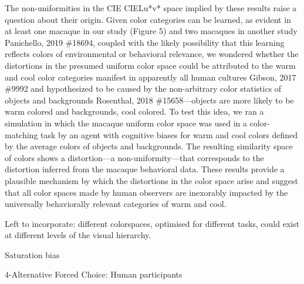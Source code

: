 The non-uniformities in the CIE CIELu*v* space implied by these results raise a question about their origin. Given color categories can be learned, as evident in at least one macaque in our study (Figure 5) and two macaques in another study {Panichello, 2019 \#18694}, coupled with the likely possibility that this learning reflects colors of environmental or behavioral relevance, we wondered whether the distortions in the presumed uniform color space could be attributed to the warm and cool color categories manifest in apparently all human cultures {Gibson, 2017 \#9992} and hypothesized to be caused by the non-arbitrary color statistics of objects and backgrounds {Rosenthal, 2018 \#15658}—objects are more likely to be warm colored and backgrounds, cool colored. To test this idea, we ran a simulation in which the macaque uniform color space was used in a color-matching task by an agent with cognitive biases for warm and cool colors defined by the average colors of objects and backgrounds. The resulting similarity space of colors shows a distortion—a non-uniformity—that corresponds to the distortion inferred from the macaque behavioral data. These results provide a plausible mechanism by which the distortions in the color space arise and suggest that all color spaces made by human observers are inexorably impacted by the universally behaviorally relevant categories of warm and cool. 

Left to incorporate: 
different colorspaces, optimised for different tasks, could exist at different levels of the visual hierarchy. 

Saturation bias

4-Alternative Forced Choice: Human participants

